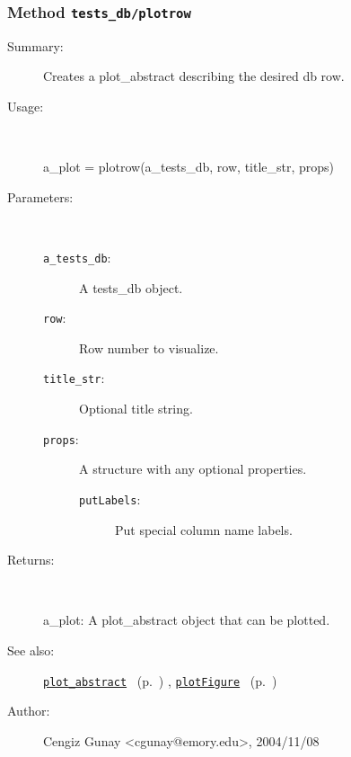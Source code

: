 \subsubsection[Method \texttt{plotrow}]{Method \texttt{tests\_db/plotrow}}%
%
\label{ref_tests_db__plotrow}%
\hypertarget{ref_tests_db__plotrow}{}%
\begin{description}
\item[Summary:]Creates a plot\_abstract describing the desired db row.
%
\item[Usage:]~%
\begin{lyxcode}%
a\_plot = plotrow(a\_tests\_db, row, title\_str, props)
%
\end{lyxcode}%
%
%
\item[Parameters:]~
\begin{description}%
\item[\texttt{a\_tests\_db}:]
 A tests\_db object.
\item[\texttt{row}:]
 Row number to visualize.
\item[\texttt{title\_str}:]
 Optional title string.
\item[\texttt{props}:]
 A structure with any optional properties.
\begin{description}%
\item[\texttt{putLabels}:]
 Put special column name labels.
\end{description}%
\end{description}%
%
\item[Returns:
]~

	a\_plot: A plot\_abstract object that can be plotted.
%
%
\item[See also:]%
\hyperlink{ref_plot_abstract}{\texttt{plot\_abstract}}%
\ (p.~\pageref{ref_plot_abstract})%
%
, \hyperlink{ref_plotFigure}{\texttt{plotFigure}}%
\ (p.~\pageref{ref_plotFigure})%
%
%
\item[Author:]%
Cengiz Gunay <cgunay@emory.edu>, 2004/11/08
%
\end{description}
\methodline%
